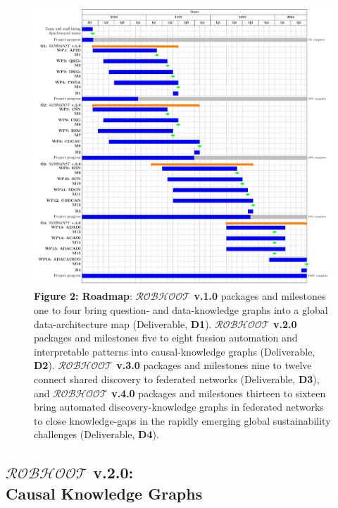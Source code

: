 \documentclass[11pt, a4paper]{article} %
\begin{document}
 \begin{figure}[h!]
   \includegraphics[width=1\textwidth]{Figures/GanttChart.pdf} {\small
     {\bf Figure 2: Roadmap}: {\bf $\mathcal{ROBHOOT}$ v.1.0} packages
     and milestones one to four bring question- and data-knowledge
     graphs into a global data-architecture map (Deliverable, {\bf
       D1}). {\bf $\mathcal{ROBHOOT}$ v.2.0} packages and milestones
     five to eight fussion automation and interpretable patterns into
     causal-knowledge graphs (Deliverable, {\bf D2}). {\bf
       $\mathcal{ROBHOOT}$ v.3.0} packages and milestones nine to
     twelve connect shared discovery to federated networks
     (Deliverable, {\bf D3}), and {\bf $\mathcal{ROBHOOT}$ v.4.0}
     packages and milestones thirteen to sixteen bring automated
     discovery-knowledge graphs in federated networks to close
     knowledge-gaps in the rapidly emerging global sustainability
     challenges (Deliverable, {\bf D4}).}
\end{figure}


\subsection{{\bf $\mathcal{ROBHOOT}$ v.2.0}: \\ Causal Knowledge Graphs}
\end{document}
